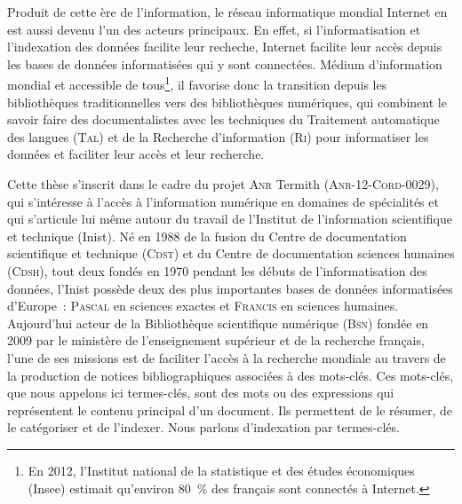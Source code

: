     Produit de cette ère de l'information, le réseau informatique mondial
    Internet en est aussi devenu l'un des acteurs principaux. En effet, si
    l'informatisation et l'indexation des données facilite leur recheche,
    Internet facilite leur accès depuis les bases de données informatisées qui y
    sont connectées. Médium d'information mondial et accessible de
    tous\footnote{En 2012, l'Institut national de la statistique et des études
    économiques (Insee) estimait qu'environ 80~\% des français sont connectés à
    Internet.}, il favorise donc la transition depuis les bibliothèques
    traditionnelles vers des bibliothèques numériques, qui combinent le savoir
    faire des documentalistes avec les techniques du Traitement automatique des
    langues (\textsc{Tal}) et de la Recherche d'information (\textsc{Ri}) pour
    informatiser les données et faciliter leur accès et leur recherche.

    Cette thèse s'inscrit dans le cadre du projet \textsc{Anr} Termith
    (\textsc{Anr-12-Cord-0029}), qui s'intéresse à l'accès à l'information
    numérique en domaines de spécialités et qui s'articule lui même autour du
    travail de l'Institut de l'information scientifique et technique (Inist). Né
    en 1988 de la fusion du Centre de documentation scientifique et technique
    (\textsc{Cdst}) et du Centre de documentation sciences humaines
    (\textsc{Cdsh}), tout deux fondés en 1970 pendant les débuts de
    l'informatisation des données, l'Inist possède deux des plus importantes
    bases de données informatisées d'Europe~: \textsc{Pascal} en sciences
    exactes et \textsc{Francis} en sciences humaines. Aujourd'hui acteur de la
    Bibliothèque scientifique numérique (\textsc{Bsn}) fondée en 2009 par le
    ministère de l'enseignement supérieur et de la recherche français, l'une de
    ses missions est de faciliter l'accès à la recherche mondiale au travers de
    la production de notices bibliographiques associées à des mots-clés. Ces
    mots-clés, que nous appelons ici termes-clés, sont des mots ou des
    expressions qui représentent le contenu principal d'un document. Ils
    permettent de le résumer, de le catégoriser et de l'indexer. Nous parlons
    d'indexation par termes-clés.
    

